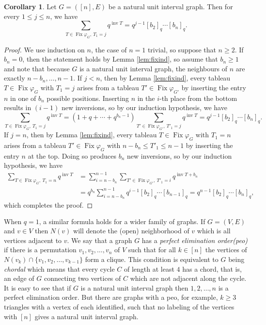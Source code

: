 \documentclass[12pt]{amsart}  %
\theoremstyle{definition}
\newtheorem{corollary}[theorem]{Corollary}
\theoremstyle{remark}
\numberwithin{equation}{section}
\DeclareMathOperator{\inv}{inv}
\DeclareMathOperator{\Fix}{Fix}
\begin{document}
\begin{corollary}
\label{qcor}
Let $G=([n],E)$ be a natural unit interval graph. Then for every $1\leq j\leq n$, we have
\begin{equation}
\sum_{T\in\Fix\varphi_G, \ T_1=j}q^{\inv T}=q^{j-1}[b_2]_q\cdots[b_n]_q.
\end{equation}
\end{corollary}

\begin{proof}
We use induction on $n$, the case of $n=1$ trivial, so suppose that $n\geq 2$. If $b_n=0$, then the statement holds by Lemma \ref{lem:fixind}, so assume that $b_n\geq 1$ and note that because $G$ is a natural unit interval graph, the neighbours of $n$ are exactly $n-b_n,\ldots,n-1$. If $j<n$, then by Lemma \ref{lem:fixind}, every tableau $T\in\Fix\varphi_G$ with $T_1=j$ arises from a tableau $T'\in\Fix\varphi_{G'}$ by inserting the entry $n$ in one of $b_n$ possible positions. Inserting $n$ in the $i$-th place from the bottom results in $(i-1)$ new inversions, so by our induction hypothesis, we have
$$\sum_{T\in\Fix\varphi_G, \ T_1=j}q^{\inv T}=(1+q+\cdots+q^{b_n-1})\sum_{T'\in\Fix\varphi_{G'}, \ T'_1=j}q^{\inv T}=q^{j-1}[b_2]_q\cdots[b_n]_q.$$
If $j=n$, then by Lemma \ref{lem:fixind}, every tableau $T\in\Fix\varphi_G$ with $T_1=n$ arises from a tableau $T'\in\Fix\varphi_G$ with $n-b_n\leq T'_1\leq n-1$ by inserting the entry $n$ at the top. Doing so produces $b_n$ new inversions, so by our induction hypothesis, we have
\begin{align*}\sum_{T\in\Fix\varphi_G, \ T_1=n}q^{\inv T}&=\sum_{i=n-b_n}^{n-1}\sum_{T'\in\Fix\varphi_{G'}, \ T'_1=i}q^{\inv T+b_n}\\&=q^{b_n}\sum_{i=n-b_n}^{n-1}q^{i-1}[b_2]_q\cdots[b_{n-1}]_q=q^{n-1}[b_2]_q\cdots[b_n]_q,\end{align*}
which completes the proof.
\end{proof}

When $q=1$, a similar formula holds for a wider family of graphs. 
If $G=(V,E)$ and $v\in V$ then $N(v)$ will denote the (open) neighborhood of $v$ which is all vertices adjacent to $v$.
We say that a graph $G$ has a {\em perfect elimination order(peo)} if there is a permutation $v_1, v_2,\ldots, v_n$ of $V$ such that for all $k\in[n]$ the vertices of $N(v_k)\cap\{v_1,v_2,\ldots,v_{k-1}\}$ form a clique. This condition is equivalent to $G$ being {\em chordal} which means that every cycle $C$ of length at least $4$ has a chord, that is, an edge of $G$ connecting two vertices of $C$ which are not adjacent along the cycle. It is easy to see that if $G$ is a natural unit interval graph then $1,2,\ldots,n$ is a perfect elimination order. But there are graphs with a peo, for example, $k\geq 3$ triangles with a vertex of each identified, such that no labeling of the vertices with $[n]$ gives a natural unit interval graph.
\end{document}
